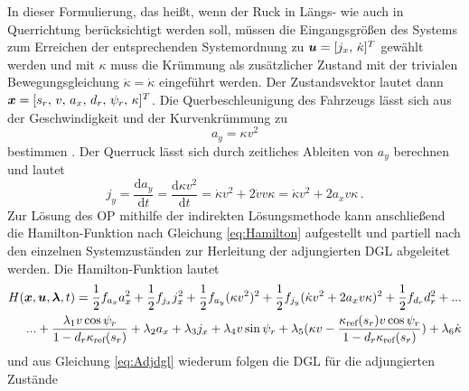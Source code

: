 In dieser Formulierung, das heißt, wenn der Ruck in Längs- wie auch in Querrichtung berücksichtigt werden soll, müssen die Eingangsgrößen des Systems zum Erreichen der entsprechenden Systemordnung zu $\boldsymbol{u} = [j_x,\,\dot{\kappa}]^T$ gewählt werden und mit $\kappa$ muss die Krümmung als zusätzlicher Zustand mit der trivialen Bewegungsgleichung $\dot{\kappa} = \dot{\kappa}$ eingeführt werden. Der Zustandsvektor lautet dann $\boldsymbol{x} = [s_r,\,v,\,a_x,\,d_r,\,\psi_r,\,\kappa]^T$. Die Querbeschleunigung des Fahrzeugs lässt sich aus der Geschwindigkeit und der Kurvenkrümmung zu 
\begin{equation}
	a_y = \kappa v^2 \label{eq:ay}
\end{equation}
bestimmen \cite{Schramm.2013}. Der Querruck lässt sich durch zeitliches Ableiten von $a_y$ berechnen und lautet
\begin{equation}
j_y = \frac{\textrm{d} a_y}{\textrm{d} t} = \frac{\textrm{d} \kappa v^2}{\textrm{d} t} = \dot{\kappa}v^2 + 2\dot{v}v\kappa  = \dot{\kappa}v^2 + 2a_xv\kappa\,. \label{eq:jy}
\end{equation}
Zur Lösung des \gls{OP} mithilfe der indirekten Lösungsmethode kann anschließend die Hamilton-Funktion nach Gleichung \eqref{eq:Hamilton} aufgestellt und partiell nach den einzelnen Systemzuständen zur Herleitung der adjungierten \gls{DGL} abgeleitet werden. Die Hamilton-Funktion lautet
\begin{equation}
\begin{split}
H(\boldsymbol{x},\boldsymbol{u},\boldsymbol{\lambda},t) = \frac{1}{2}f_{a_x} a_x^2 + \frac{1}{2}f_{j_x} j_x^2 + \frac{1}{2}f_{a_y} (\kappa v^2)^2 + \frac{1}{2}f_{j_y} (\dot{\kappa}v^2 + 2a_xv\kappa)^2 + \frac{1}{2}f_{d_r} d_r^2 + ... \\
... + \frac{\lambda_1v\cos{\psi_r}}{1-d_r\kappa_{\textrm{ref}}(s_r)} + \lambda_2a_x + \lambda_3j_x + \lambda_4v\sin{\psi_r} + \lambda_5(\kappa v - \frac{\kappa_{\textrm{ref}}(s_r) v\cos{\psi_r}}{1-d_r\kappa_{\textrm{ref}}(s_r)}) + \lambda_6\dot{\kappa} \label{eq:Hamilton_eingesetzt}
\end{split}
\end{equation}
und aus Gleichung \eqref{eq:Adjdgl} wiederum folgen die \gls{DGL} für die adjungierten Zustände
